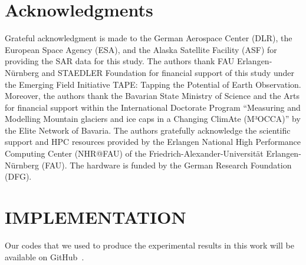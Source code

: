 \documentclass[lettersize,journal,siunitx]{IEEEtran}
\begin{document}
\section*{Acknowledgments}
Grateful acknowledgment is made to the German Aerospace Center (DLR), the European Space Agency (ESA), and the Alaska Satellite Facility (ASF) for providing the SAR data for this study. The authors thank FAU Erlangen-Nürnberg and STAEDLER Foundation for financial support of this study under the Emerging Field Initiative TAPE: Tapping the Potential of Earth Observation. Moreover, the authors thank the Bavarian State Ministry of Science and the Arts for financial support within the International Doctorate Program “Measuring and Modelling Mountain glaciers and ice caps in a Changing ClimAte (M³OCCA)” by the Elite Network of Bavaria. The authors gratefully acknowledge the scientific support and HPC resources provided by the Erlangen National High Performance Computing Center (NHR@FAU) of the Friedrich-Alexander-Universität Erlangen-Nürnberg (FAU). The hardware is funded by the German Research Foundation (DFG).

\section*{IMPLEMENTATION}
Our codes that we used to produce the experimental results in this work will be available on GitHub~\cite{WinNT}.



\end{document}
